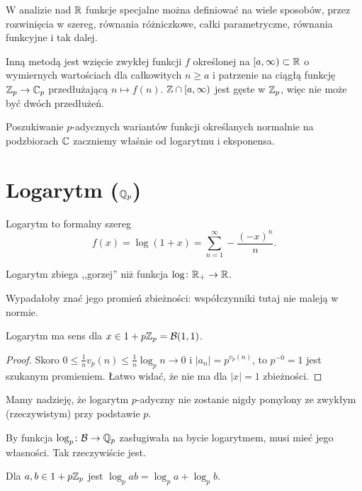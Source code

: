 W analizie nad $\mathbb R$ funkcje specjalne można definiować na wiele sposobów, przez rozwinięcia w szereg, równania różniczkowe, całki parametryczne, równania funkcyjne i tak dalej.

Inną metodą jest wzięcie zwykłej funkcji $f$ określonej na $[a, \infty) \subset \mathbb R$ o wymiernych wartościach dla całkowitych $n \ge a$ i patrzenie na ciągłą funkcję $\mathbb Z_p \to \mathbb C_p$ przedłużającą $n \mapsto f(n)$.
$\mathbb Z \cap [a, \infty)$ jest gęste w $\mathbb Z_p$, więc nie może być dwóch przedłużeń.

Poszukiwanie $p$-adycznych wariantów funkcji określanych normalnie na podzbiorach $\mathbb C$ zaczniemy właśnie od logarytmu i eksponensa.

\section{Logarytm ($\mathbb Q_p$)}

\begin{definicja}
	Logarytm to formalny szereg
	\[
		f(x) = \log(1+x) = \sum_{n = 1}^\infty - \frac{(-x)^n}{n}.
	\]
\end{definicja}

Logarytm zbiega ,,gorzej'' niż funkcja $\log \colon \mathbb R_+ \to \mathbb R$.

Wypadałoby znać jego promień zbieżności: współczynniki tutaj nie maleją w normie.

\begin{fakt}
	Logarytm ma sens dla $x \in 1 + p\mathbb Z_p = \mathcal B(1,1)$.
\end{fakt}

\begin{proof}
Skoro $0 \le \frac 1 n v_p (n) \le \frac 1 n \log_p n \to 0$ i $|a_n| = p^{v_p(n)}$, to $p^{-0} = 1$ jest szukanym promieniem.
Łatwo widać, że nie ma dla $|x| = 1$ zbieżności.
\end{proof}

Mamy nadzieję, że logarytm $p$-adyczny nie zostanie nigdy pomylony ze zwykłym (rzeczywistym) przy podstawie $p$.

By funkcja $\log_p \colon \mathcal B \to \mathbb Q_p$ zasługiwała na bycie logarytmem, musi mieć jego własności. Tak rzeczywiście jest.

\begin{fakt}
	Dla $a, b \in 1+p\mathbb Z_p$ jest $\log_p ab = \log_p a + \log_p b$.
\end{fakt}

